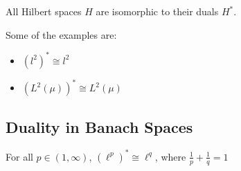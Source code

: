 \documentclass{article}
\begin{document}
\begin{corollary}
    All Hilbert spaces  \(H\) are isomorphic to their duals  \(H^*\).
\end{corollary}  


\begin{example}
     Some of the examples are: 
    \begin{itemize}
        \item  \((l^2)^* \cong l^2\)
        \item  \((L^2(\mu))^* \cong L^2(\mu)\)
    \end{itemize}
\end{example}


\subsection{Duality in Banach Spaces}  

\begin{theorem}\nl
 For all  \(p \in (1, \infty)\),  \((\ell^p)^* \cong \ell^q\), where  \(\frac{1}{p}+\frac{1}{q}=1\)
\end{theorem}  
\end{document}
